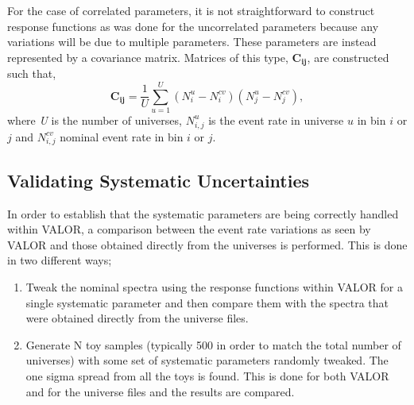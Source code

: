 For the case of correlated parameters, it is not straightforward to construct response functions as was done for the uncorrelated parameters because any variations will be due to multiple parameters. These parameters are instead represented by a covariance matrix. Matrices of this type, $\mathbf{C_{ij}}$, are constructed such that,
\begin{equation}
  \mathbf{C_{ij}} = \frac{1}{U} \sum_{u=1}^{U} (N_{i}^{u}-N_{i}^{cv})(N_{j}^{u}-N_{j}^{cv}),
  \label{eq:covmatrix}
\end{equation}
where \textit{U} is the number of universes, $N_{i,j}^{u}$ is the event rate in universe $u$ in bin $i$ or $j$ and $N_{i,j}^{cv}$ nominal event rate in
bin $i$ or $j$.

\subsection{Validating Systematic Uncertainties}
In order to establish that the systematic parameters are being correctly handled within VALOR, a comparison between the event rate variations as seen by VALOR and those obtained directly from the universes is performed. This is done in two different ways; 
\begin{enumerate}
    \item Tweak the nominal spectra using the response functions within VALOR for a single systematic parameter and then compare them with the spectra that were obtained directly from the universe files.
    \item Generate N toy samples (typically 500 in order to match the total number of universes) with some set of systematic parameters randomly tweaked. The one sigma spread from all the toys is found. This is done for both VALOR and for the universe files and the results are compared. 
\end{enumerate}

